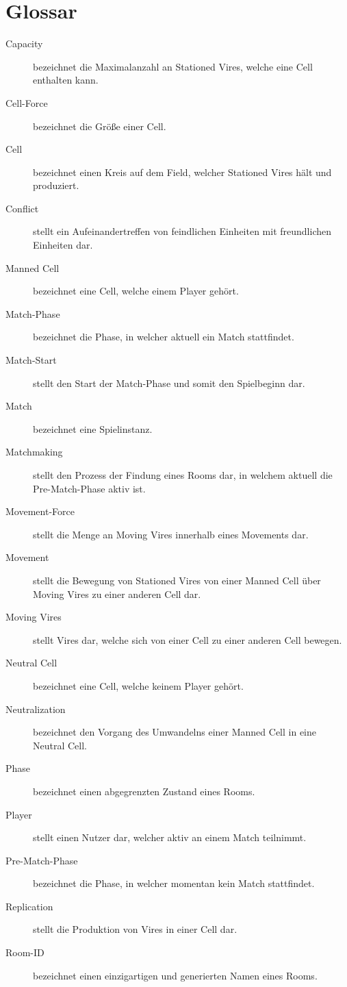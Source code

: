 \section{Glossar}
\label{sec:glossar}
\begin{description}
	\item[Capacity] bezeichnet die Maximalanzahl an Stationed Vires, welche eine Cell enthalten kann.
	\item[Cell-Force] bezeichnet die Größe einer Cell.
	\item[Cell] bezeichnet einen Kreis auf dem Field, welcher Stationed Vires hält und produziert.
	\item[Conflict] stellt ein Aufeinandertreffen von feindlichen Einheiten mit freundlichen Einheiten dar.
	\item[Manned Cell] bezeichnet eine Cell, welche einem Player gehört.
	\item[Match-Phase] bezeichnet die Phase, in welcher aktuell ein Match stattfindet.
	\item[Match-Start] stellt den Start der Match-Phase und somit den Spielbeginn dar.
	\item[Match] bezeichnet eine Spielinstanz.
	\item[Matchmaking] stellt den Prozess der Findung eines Rooms dar, in welchem aktuell die Pre-Match-Phase aktiv ist.
	\item[Movement-Force] stellt die Menge an Moving Vires innerhalb eines Movements dar.
	\item[Movement] stellt die Bewegung von Stationed Vires von einer Manned Cell über Moving Vires zu einer anderen Cell dar. 
	\item[Moving Vires] stellt Vires dar, welche sich von einer Cell zu einer anderen Cell bewegen.
	\item[Neutral Cell] bezeichnet eine Cell, welche keinem Player gehört.
	\item[Neutralization] bezeichnet den Vorgang des Umwandelns einer Manned Cell in eine Neutral Cell.
	\item[Phase] bezeichnet einen abgegrenzten Zustand eines Rooms.
	\item[Player] stellt einen Nutzer dar, welcher aktiv an einem Match teilnimmt.
	\item[Pre-Match-Phase] bezeichnet die Phase, in welcher momentan kein Match stattfindet.
	\item[Replication] stellt die Produktion von Vires in einer Cell dar.
	\item[Room-ID] bezeichnet einen einzigartigen und generierten Namen eines Rooms.

\end{description}
